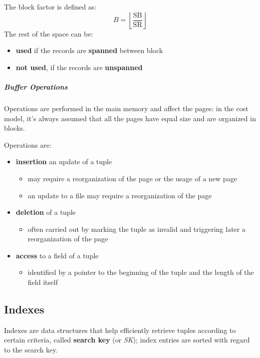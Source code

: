 \documentclass[english]{article}
\begin{document}
The block factor is defined as:
\[ B = \left\lfloor \frac{\text{SB}}{\text{SR}} \right\rfloor \]
The rest of the space can be:

\begin{itemize}
  \item \textbf{used} if the records are \textbf{spanned} between block
  \item \textbf{not used}, if the records are \textbf{unspanned}
\end{itemize}

\subparagraph*{Buffer Operations}

Operations are performed in the main memory and affect the pages: in the cost model, it's always assumed that all the pages have equal size and are organized in blocks.

Operations are:

\begin{itemize}
  \item \textbf{insertion} an update of a tuple
        \begin{itemize}
          \item may require a reorganization of the page or the usage of a new page
          \item an update to a file may require a reorganization of the page
        \end{itemize}
  \item \textbf{deletion} of a tuple
        \begin{itemize}
          \item often carried out by marking the tuple as invalid and triggering later a reorganization of the page
        \end{itemize}
  \item \textbf{access} to a field of a tuple
        \begin{itemize}
          \item identified by a pointer to the beginning of the tuple and the length of the field itself
        \end{itemize}
\end{itemize}

\subsection{Indexes}

Indexes are data structures that help efficiently retrieve tuples according to certain criteria, called \textbf{search key} (or \textit{SK}); index entries are sorted with regard to the search key.
\end{document}
